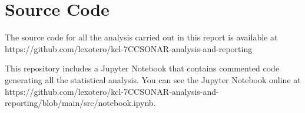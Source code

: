\section{Source Code}

The source code for all the analysis carried out in this report is available at
https://github.com/lexotero/kcl-7CCSONAR-analysis-and-reporting

This repository includes a Jupyter Notebook that contains commented code generating all the statistical analysis. You can
see the Jupyter Notebook online at https://github.com/lexotero/kcl-7CCSONAR-analysis-and-reporting/blob/main/src/notebook.ipynb. 